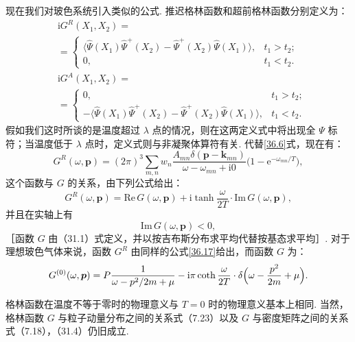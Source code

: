 现在我们对玻色系统引入类似的公式. 推迟格林函数和超前格林函数分别定义为：
\begin{equation}
\begin{aligned}
&\mathrm{i}G^{R}(X_1,X_2)=\\
&=\left\{\begin{array}{ll}
\langle\hat\Psi(X_1)\hat\Psi^{+}(X_2)-\hat\Psi^{+}(X_2)\hat\Psi(X_1)\rangle, & t_1>t_2;\\[0.2em]
0, & t_1<t_2.
\end{array}\right.\\[0.8em]
&\mathrm{i}G^{A}(X_1,X_2)=\\
&=\left\{\begin{array}{ll}
0, & t_1>t_2;\\[0.2em]
-\langle\hat\Psi(X_1)\hat\Psi^{+}(X_2)-\hat\Psi^{+}(X_2)\hat\Psi(X_1)\rangle, & t_1<t_2.
\end{array}\right.
\end{aligned}
\label{36.19}
\end{equation}
假如我们这时所谈的是温度超过 $\lambda$ 点的情况，则在这两定义式中将出现全 $\Psi$ 标符；当温度低于 $\lambda$ 点时，定义式则与非凝聚体算符有关. 代替\eqref{36.6}式，现在有：
\begin{equation}
G^{R}(\omega,\bm p)=(2\pi)^{3}\sum_{m,n}w_n
\frac{A_{mn}\delta(\bm p-\bm k_{mn})}{\omega-\omega_{mn}+\mathrm{i}0}
\bigl(1-\mathrm{e}^{-\omega_{mn}/T}\bigr),
\label{36.20}
\end{equation}
这个函数与 $G$ 的关系，由下列公式给出：
\begin{equation}
G^{R}(\omega,\bm p)=\mathrm{Re}\,G(\omega,\bm p)
+\mathrm{i}\tanh\frac{\omega}{2T}\cdot\mathrm{Im}\,G(\omega,\bm p),
\label{36.21}
\end{equation}
并且在实轴上有
\begin{equation}
\mathrm{Im}\,G(\omega,\bm p)<0,
\label{36.22}
\end{equation}
［函数 $G$ 由（31.1）式定义，并以按吉布斯分布求平均代替按基态求平均］. 对于理想玻色气体来说，函数 $G^{R}$ 由同样的公式\eqref{36.17}给出，而函数 $G$ 为：
\begin{equation}
G^{(0)}(\omega,\bm p)=P\frac{1}{\omega-p^{2}/2m+\mu}
-\mathrm{i}\pi\coth\frac{\omega}{2T}\cdot\delta\Bigl(\omega-\frac{p^{2}}{2m}+\mu\Bigr).
\label{36.23}
\end{equation}

格林函数在温度不等于零时的物理意义与 $T=0$ 时的物理意义基本上相同. 当然，格林函数 $G$ 与粒子动量分布之间的关系式（7.23）以及 $G$ 与密度矩阵之间的关系式（7.18），（31.4）仍旧成立.

